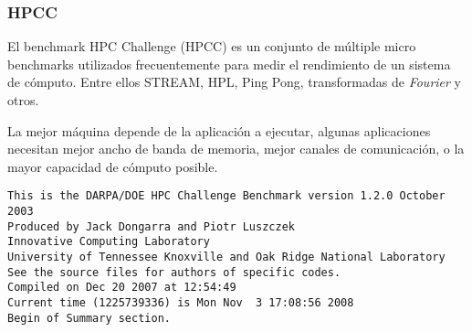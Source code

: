 \documentclass[a4paper]{report}
\begin{document}
\subsubsection{HPCC}

El benchmark HPC Challenge (HPCC) es un conjunto de m\'ultiple micro benchmarks utilizados frecuentemente para medir
el rendimiento de un sistema de c\'omputo. Entre ellos STREAM, HPL, Ping Pong, transformadas de {\it Fourier} y
otros.

La mejor m\'aquina depende de la aplicaci\'on a ejecutar, algunas aplicaciones necesitan mejor ancho de banda de
memoria, mejor canales de comunicaci\'on, o la mayor capacidad de c\'omputo posible.

\begin{verbatim}
This is the DARPA/DOE HPC Challenge Benchmark version 1.2.0 October 2003
Produced by Jack Dongarra and Piotr Luszczek
Innovative Computing Laboratory
University of Tennessee Knoxville and Oak Ridge National Laboratory
See the source files for authors of specific codes.
Compiled on Dec 20 2007 at 12:54:49
Current time (1225739336) is Mon Nov  3 17:08:56 2008
Begin of Summary section.
\end{verbatim}
\end{document}
